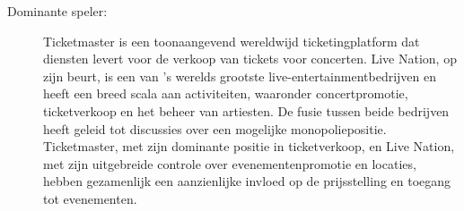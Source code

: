 \begin{description}
    \item[Dominante speler:] Ticketmaster is een toonaangevend wereldwijd ticketingplatform dat diensten levert voor de verkoop van tickets voor concerten. Live Nation, op zijn beurt, is een van 's werelds grootste live-entertainmentbedrijven en heeft een breed scala aan activiteiten, waaronder concertpromotie, ticketverkoop en het beheer van artiesten. De fusie tussen beide bedrijven heeft geleid tot discussies over een mogelijke monopoliepositie. Ticketmaster, met zijn dominante positie in ticketverkoop, en Live Nation, met zijn uitgebreide controle over evenementenpromotie en locaties, hebben gezamenlijk een aanzienlijke invloed op de prijsstelling en toegang tot evenementen.

\end{description}

